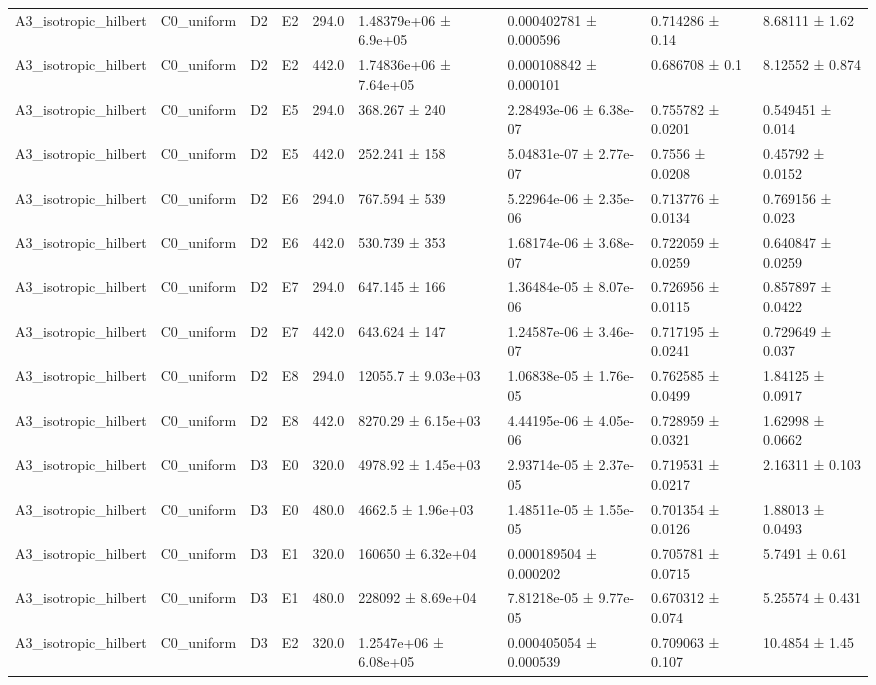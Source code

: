 \begin{table}
\begin{tabular}{lllllllll}
A3\_isotropic\_hilbert & C0\_uniform & D2 & E2 & 294.0 & 1.48379e+06 ± 6.9e+05 & 0.000402781 ± 0.000596 & 0.714286 ± 0.14 & 8.68111 ± 1.62 \\
A3\_isotropic\_hilbert & C0\_uniform & D2 & E2 & 442.0 & 1.74836e+06 ± 7.64e+05 & 0.000108842 ± 0.000101 & 0.686708 ± 0.1 & 8.12552 ± 0.874 \\
A3\_isotropic\_hilbert & C0\_uniform & D2 & E5 & 294.0 & 368.267 ± 240 & 2.28493e-06 ± 6.38e-07 & 0.755782 ± 0.0201 & 0.549451 ± 0.014 \\
A3\_isotropic\_hilbert & C0\_uniform & D2 & E5 & 442.0 & 252.241 ± 158 & 5.04831e-07 ± 2.77e-07 & 0.7556 ± 0.0208 & 0.45792 ± 0.0152 \\
A3\_isotropic\_hilbert & C0\_uniform & D2 & E6 & 294.0 & 767.594 ± 539 & 5.22964e-06 ± 2.35e-06 & 0.713776 ± 0.0134 & 0.769156 ± 0.023 \\
A3\_isotropic\_hilbert & C0\_uniform & D2 & E6 & 442.0 & 530.739 ± 353 & 1.68174e-06 ± 3.68e-07 & 0.722059 ± 0.0259 & 0.640847 ± 0.0259 \\
A3\_isotropic\_hilbert & C0\_uniform & D2 & E7 & 294.0 & 647.145 ± 166 & 1.36484e-05 ± 8.07e-06 & 0.726956 ± 0.0115 & 0.857897 ± 0.0422 \\
A3\_isotropic\_hilbert & C0\_uniform & D2 & E7 & 442.0 & 643.624 ± 147 & 1.24587e-06 ± 3.46e-07 & 0.717195 ± 0.0241 & 0.729649 ± 0.037 \\
A3\_isotropic\_hilbert & C0\_uniform & D2 & E8 & 294.0 & 12055.7 ± 9.03e+03 & 1.06838e-05 ± 1.76e-05 & 0.762585 ± 0.0499 & 1.84125 ± 0.0917 \\
A3\_isotropic\_hilbert & C0\_uniform & D2 & E8 & 442.0 & 8270.29 ± 6.15e+03 & 4.44195e-06 ± 4.05e-06 & 0.728959 ± 0.0321 & 1.62998 ± 0.0662 \\
A3\_isotropic\_hilbert & C0\_uniform & D3 & E0 & 320.0 & 4978.92 ± 1.45e+03 & 2.93714e-05 ± 2.37e-05 & 0.719531 ± 0.0217 & 2.16311 ± 0.103 \\
A3\_isotropic\_hilbert & C0\_uniform & D3 & E0 & 480.0 & 4662.5 ± 1.96e+03 & 1.48511e-05 ± 1.55e-05 & 0.701354 ± 0.0126 & 1.88013 ± 0.0493 \\
A3\_isotropic\_hilbert & C0\_uniform & D3 & E1 & 320.0 & 160650 ± 6.32e+04 & 0.000189504 ± 0.000202 & 0.705781 ± 0.0715 & 5.7491 ± 0.61 \\
A3\_isotropic\_hilbert & C0\_uniform & D3 & E1 & 480.0 & 228092 ± 8.69e+04 & 7.81218e-05 ± 9.77e-05 & 0.670312 ± 0.074 & 5.25574 ± 0.431 \\
A3\_isotropic\_hilbert & C0\_uniform & D3 & E2 & 320.0 & 1.2547e+06 ± 6.08e+05 & 0.000405054 ± 0.000539 & 0.709063 ± 0.107 & 10.4854 ± 1.45 \\

\end{tabular}
\end{table}
